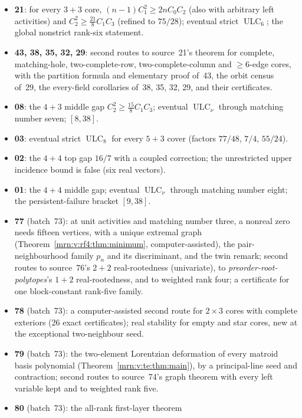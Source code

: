 \documentclass[11pt,a4paper]{article}
\theoremstyle{remark}\newtheorem{remark}[theorem]{Remark}
\newcommand{\ULC}{\operatorname{ULC}}      %
\newcommand{\prp}{\emph{preorder-root-polytopes}}
\begin{document}
\begin{itemize}
  $b$; eventual strict $\ULC$ for $3+3$, $3+4$, $3+5$ covers; the reduction of
  rank seven to the $4+3$ middle gap; a weighted local-equality lemma; the
  bracket $[7,38]$ (superseded).
\item \textbf{21}: for every $3+3$ core, $(n-1)C_1^2\ge2nC_0C_2$ (also with
  arbitrary left activities) and $C_2^2\ge\frac{21}{8}C_1C_3$ (refined to
  $75/28$); eventual strict $\ULC_6$; the global nonstrict rank-six statement.
\item \textbf{43, 38, 35, 32, 29}: second routes to source~21's theorem for
  complete, matching-hole, two-complete-row, two-complete-column and
  $\ge6$-edge cores, with the partition formula and elementary proof of~43,
  the orbit census of~29, the every-field corollaries of~38, 35, 32, 29, and
  their certificates.
\item \textbf{08}: the $4+3$ middle gap $C_2^2\ge\frac{15}{8}C_1C_3$; eventual
  $\ULC_\nu$ through matching number seven; $[8,38]$.
\item \textbf{03}: eventual strict $\ULC_8$ for every $5+3$ cover (factors
  $77/48$, $7/4$, $55/24$).
\item \textbf{02}: the $4+4$ top gap $16/7$ with a coupled correction; the
  unrestricted upper incidence bound is false (six real vectors).
\item \textbf{01}: the $4+4$ middle gap; eventual $\ULC_\nu$ through matching
  number eight; the persistent-failure bracket $[9,38]$.
\item \textbf{77} (batch~73): at unit activities and matching number three, a
  nonreal zero needs fifteen vertices, with a unique extremal graph
  (Theorem~\ref{mrn:v:rf4:thm:minimum}, computer-assisted), the
  pair-neighbourhood family $p_n$ and its discriminant, and the twin remark;
  second routes to source~76's $2+2$ real-rootedness (univariate), to \prp's
  $1+2$ real-rootedness, and to weighted rank four; a certificate for one
  block-constant rank-five family.
\item \textbf{78} (batch~73): a computer-assisted second route for $2\times3$
  cores with complete exteriors (26 exact certificates); real stability for
  empty and star cores, new at the exceptional two-neighbour seed.
\item \textbf{79} (batch~73): the two-element Lorentzian deformation of every
  matroid basis polynomial (Theorem~\ref{mrn:v:te:thm:main}), by a
  principal-line seed and contraction; second routes to source~74's graph
  theorem with every left variable kept and to weighted rank five.
\item \textbf{80} (batch~73): the all-rank first-layer theorem

\end{itemize}
\end{document}
